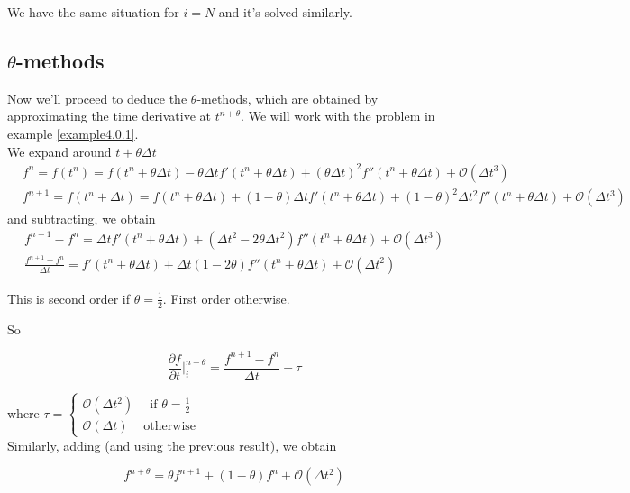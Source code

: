 \begin{remark}
  We have the same situation for $i = N$ and it's solved similarly.
\end{remark}


\subsection{$\theta$-methods}

Now we'll proceed to deduce the $\theta$-methods, which are obtained by approximating the time derivative at $t^{n+\theta}$. We will work with the problem in example \ref{example4.0.1}.\\

We expand around $t+\theta\Delta t$
\begin{align*}
    &f^n = f(t^n) = f(t^n+\theta\Delta t) - \theta\Delta tf'(t^n+\theta \Delta t) + (\theta\Delta t)^2 f''(t^n + \theta\Delta t) + \mathcal{O}(\Delta t^3)\\
    &f^{n+1} = f(t^n+\Delta t) = f(t^n + \theta\Delta t) + (1-\theta)\Delta t f'(t^n + \theta\Delta t) + (1-\theta)^2\Delta t^2 f''(t^n + \theta\Delta t) + \mathcal{O}(\Delta t^3)
\end{align*}
and subtracting, we obtain
\begin{align*}
    f^{n+1} - f^n = \Delta tf'(t^n + \theta\Delta t) + (\Delta t^2 - 2\theta\Delta t^2)f''(t^n + \theta\Delta t) + \mathcal{O}(\Delta t^3)\\
    \frac{f^{n+1} - f^n}{\Delta t} = f'(t^n + \theta\Delta t) + \Delta t (1 - 2\theta)f''(t^n + \theta\Delta t) + \mathcal{O}(\Delta t^2)
\end{align*}

\begin{remark}
  This is second order if $\theta = \frac{1}{2}$. First order otherwise.
\end{remark}

So

\[
  \frac{\partial f}{\partial t}\Bigg|_i^{n+\theta} = \frac{f^{n+1} - f^n}{\Delta t} + \tau
\]

where $\tau = \begin{cases}
  \mathcal{O}(\Delta t^2) &\,\text{ if } \theta = \frac{1}{2}\\
  \mathcal{O}(\Delta t) & \text{otherwise}
\end{cases}$\\

Similarly, adding (and using the previous result), we obtain

\[
   f^{n+\theta} = \theta f^{n+1} + (1-\theta)f^n + \mathcal{O}(\Delta t^2)
\]

